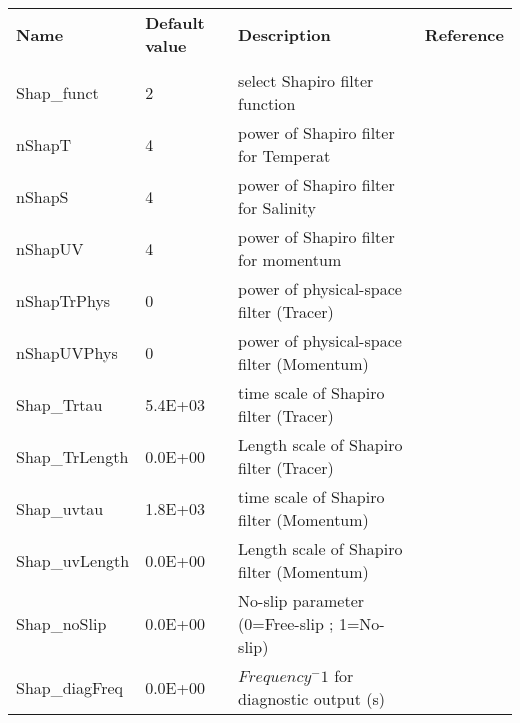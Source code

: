 
\begin{table}[ht!]
\hspace*{-0.5cm}
\begin{tabular}{lllc}

  \textbf{Name}  &  \textbf{Default value}  
    &  \textbf{Description}   &  \textbf{Reference}  \\
  & & & \\

   Shap\_funct   &                         2
    &   select Shapiro filter function 
    &  %
    \\
   nShapT   &                         4
    &   power of Shapiro filter for Temperat 
    &  %
    \\
   nShapS   &                         4
    &   power of Shapiro filter for Salinity 
    &  %
    \\
   nShapUV   &                         4
    &   power of Shapiro filter for momentum 
    &  %
    \\
   nShapTrPhys   &                         0
    &   power of physical-space filter (Tracer) 
    &  %
    \\
   nShapUVPhys   &                         0
    &   power of physical-space filter (Momentum) 
    &  %
    \\
   Shap\_Trtau   &                   5.4E+03
    &   time scale of Shapiro filter (Tracer) 
    &  %
    \\
   Shap\_TrLength   &                   0.0E+00
    &   Length scale of Shapiro filter (Tracer) 
    &  %
    \\
   Shap\_uvtau   &                   1.8E+03
    &   time scale of Shapiro filter (Momentum) 
    &  %
    \\
   Shap\_uvLength   &                   0.0E+00
    &   Length scale of Shapiro filter (Momentum) 
    &  %
    \\
   Shap\_noSlip   &                   0.0E+00
    &   No-slip parameter (0=Free-slip ; 1=No-slip)
    &  %
    \\
   Shap\_diagFreq   &                   0.0E+00
    &   $Frequency^-1$ for diagnostic output (s)
    &  %
    \\

\end{tabular}
\end{table}

